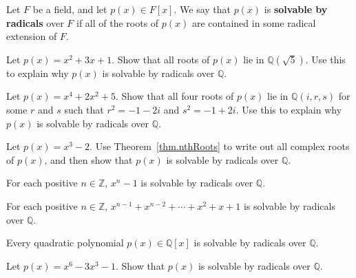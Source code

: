 \begin{definition}
Let $F$ be a field, and let $p(x)\in F[x]$. We say that $p(x)$ is \textbf{solvable by radicals} over $F$ if all of the roots of $p(x)$ are contained in some radical extension of $F$.
\end{definition}

\begin{problem}
Let $p(x) = x^2+3x+1$. Show that all roots of $p(x)$ lie in $\mathbb{Q}\left(\sqrt{5}\right)$. Use this to explain why $p(x)$ is solvable by radicals over $\mathbb{Q}$.
\end{problem}

\begin{problem}
Let $p(x) = x^4+2x^2+5$. Show that all four roots of $p(x)$ lie in $\mathbb{Q}\left(i,r,s\right)$ for some $r$ and $s$ such that  $r^2 = -1-2i$ and $s^2 = -1+2i$. Use this to explain why $p(x)$ is solvable by radicals over $\mathbb{Q}$.
\end{problem}

\begin{problem}
Let $p(x) = x^3 - 2$. Use Theorem~\ref{thm.nthRoots} to write out all complex roots of $p(x)$, and then show that $p(x)$ is solvable by radicals over $\mathbb{Q}$.
\end{problem}

\begin{theorem}
For each positive $n\in \mathbb{Z}$,   $ x^n - 1$ is solvable by radicals over $\mathbb{Q}$.
\end{theorem}

\begin{theorem}\label{thm.SolvableByRadicalsNontrivialRootsOf1}
For each positive $n\in \mathbb{Z}$,   $x^{n-1} + x^{n-2} + \cdots + x^2 + x + 1$ is solvable by radicals over $\mathbb{Q}$.
\end{theorem}

\begin{theorem}
Every quadratic polynomial $p(x)\in \mathbb{Q}[x]$ is solvable by radicals over $\mathbb{Q}$.
\end{theorem}

\begin{problem}\label{prob.SolvableByRadicalsHard}
Let $p(x) = x^6 - 3x^3 - 1$. Show that $p(x)$ is solvable by radicals over $\mathbb{Q}$.
\end{problem}

